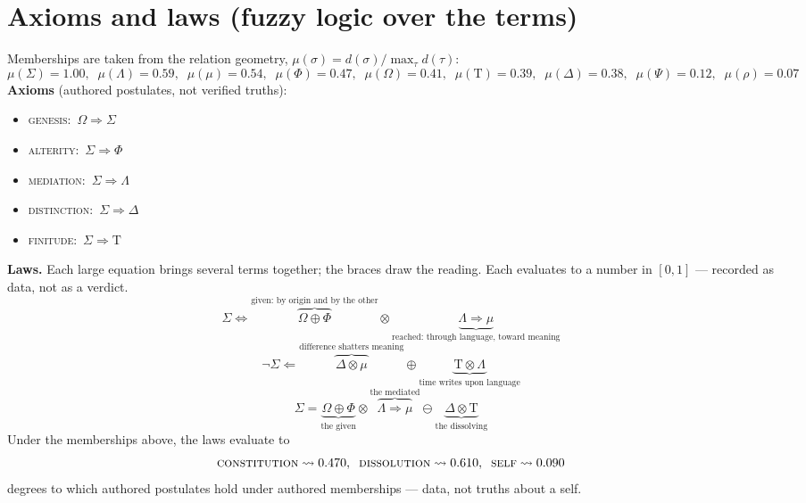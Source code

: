 \documentclass[11pt]{article}
\newcommand{\Tau}{\mathrm{T}}
\begin{document}
\section*{Axioms and laws (fuzzy logic over the terms)}
Memberships are taken from the relation geometry, $\mu(\sigma)=d(\sigma)/\max_\tau d(\tau)$:\begin{equation*}\mu(\Sigma){=}1.00,\;\; \mu(\Lambda){=}0.59,\;\; \mu(\mu){=}0.54,\;\; \mu(\Phi){=}0.47,\;\; \mu(\Omega){=}0.41,\;\; \mu(\Tau){=}0.39,\;\; \mu(\Delta){=}0.38,\;\; \mu(\Psi){=}0.12,\;\; \mu(\rho){=}0.07\end{equation*}
\noindent\textbf{Axioms} (authored postulates, not verified truths):\begin{itemize}\item \textsc{genesis}: $\,\Omega \Rightarrow \Sigma\,$\item \textsc{alterity}: $\,\Sigma \Rightarrow \Phi\,$\item \textsc{mediation}: $\,\Sigma \Rightarrow \Lambda\,$\item \textsc{distinction}: $\,\Sigma \Rightarrow \Delta\,$\item \textsc{finitude}: $\,\Sigma \Rightarrow \Tau\,$\end{itemize}
\noindent\textbf{Laws.} Each large equation brings several terms together; the braces draw the reading. Each evaluates to a number in $[0,1]$ --- recorded as data, not as a verdict.
\begin{equation*}\Sigma \Longleftrightarrow \overbrace{\Omega \oplus \Phi}^{\text{given: by origin and by the other}} \otimes \underbrace{\Lambda \Rightarrow \mu}_{\text{reached: through language, toward meaning}}\end{equation*}
\begin{equation*}\neg \Sigma \Longleftarrow \overbrace{\Delta \otimes \mu}^{\text{difference shatters meaning}} \oplus \underbrace{\Tau \otimes \Lambda}_{\text{time writes upon language}}\end{equation*}
\begin{equation*}\Sigma = \underbrace{\Omega \oplus \Phi}_{\text{the given}} \otimes \overbrace{\Lambda \Rightarrow \mu}^{\text{the mediated}} \ominus \underbrace{\Delta \otimes \Tau}_{\text{the dissolving}}\end{equation*}
Under the memberships above, the laws evaluate to\begin{equation*}\textsc{constitution}\rightsquigarrow 0.470,\;\; \textsc{dissolution}\rightsquigarrow 0.610,\;\; \textsc{self}\rightsquigarrow 0.090\end{equation*}\noindent degrees to which authored postulates hold under authored memberships --- data, not truths about a self.
\end{document}
